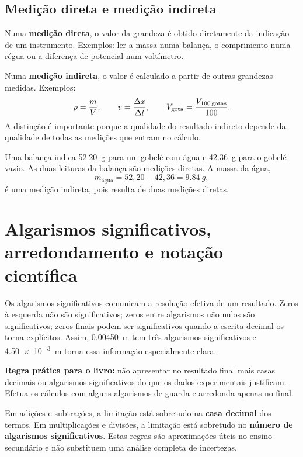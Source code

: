 \documentclass[11pt,a4paper,openany]{book}
\begin{document}
\subsection{Medição direta e medição indireta}
Numa \textbf{medição direta}, o valor da grandeza é obtido diretamente da indicação de um instrumento. Exemplos: ler a massa numa balança, o comprimento numa régua ou a diferença de potencial num voltímetro.

Numa \textbf{medição indireta}, o valor é calculado a partir de outras grandezas medidas. Exemplos:
\[
\rho=\frac{m}{V},\qquad v=\frac{\Delta x}{\Delta t},\qquad
V_{\rm gota}=\frac{V_{100\,\rm gotas}}{100}.
\]
A distinção é importante porque a qualidade do resultado indireto depende da qualidade de todas as medições que entram no cálculo.

\begin{exemploresolvido}
Uma balança indica \SI{52.20}{g} para um gobelé com água e \SI{42.36}{g} para o gobelé vazio. As duas leituras da balança são medições diretas. A massa da água,
\[
m_{\text{água}}=52,20-42,36=\SI{9.84}{g},
\]
é uma medição indireta, pois resulta de duas medições diretas.
\end{exemploresolvido}

\section{Algarismos significativos, arredondamento e notação científica}
Os algarismos significativos comunicam a resolução efetiva de um resultado. Zeros à esquerda não são significativos; zeros entre algarismos não nulos são significativos; zeros finais podem ser significativos quando a escrita decimal os torna explícitos. Assim, \SI{0.00450}{m} tem três algarismos significativos e \SI{4.50e-3}{m} torna essa informação especialmente clara.

\begin{essencial}
\textbf{Regra prática para o livro:} não apresentar no resultado final mais casas decimais ou algarismos significativos do que os dados experimentais justificam. Efetua os cálculos com alguns algarismos de guarda e arredonda apenas no final.
\end{essencial}

Em adições e subtrações, a limitação está sobretudo na \textbf{casa decimal} dos termos. Em multiplicações e divisões, a limitação está sobretudo no \textbf{número de algarismos significativos}. Estas regras são aproximações úteis no ensino secundário e não substituem uma análise completa de incertezas.
\end{document}
